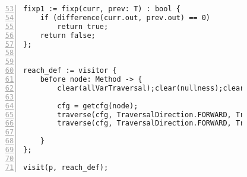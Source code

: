 \begin{figure}[ht!]
\begin{lstlisting}[numbers=left, tabsize=4, escapechar=@, caption={Nullness Analysis},label={lst:na-code}, firstline = 53, firstnumber=53, lastline = 105]
fixp1 := fixp(curr, prev: T) : bool {
	if (difference(curr.out, prev.out) == 0)
		return true;	
	return false;
};


reach_def := visitor {
	before node: Method -> {
		clear(allVarTraversal);clear(nullness);clear(local);

		cfg = getcfg(node);
		traverse(cfg, TraversalDirection.FORWARD, TraversalKind.HYBRID, allVarTraversal);
		traverse(cfg, TraversalDirection.FORWARD, TraversalKind.HYBRID, nullness, fixp1);
			
	}
};

visit(p, reach_def);
\end{lstlisting}
\end{figure}